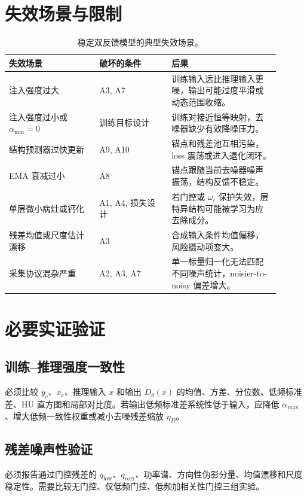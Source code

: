 \documentclass[11pt,a4paper,UTF8,fontset=fandol]{ctexart}
\theoremstyle{definition}
\begin{document}
\section{失效场景与限制}

\begin{table}[htbp]
\centering
\small
\begin{tabular}{p{0.30\linewidth}p{0.24\linewidth}p{0.36\linewidth}}
\toprule
失效场景 & 破坏的条件 & 后果 \\
\midrule
注入强度过大 & A3, A7 & 训练输入远比推理输入更噪，输出可能过度平滑或动态范围收缩。 \\
注入强度过小或 $\alpha_{\min}=0$ & 训练目标设计 & 训练对接近恒等映射，去噪器缺少有效降噪压力。 \\
结构预测器过快更新 & A9, A10 & 锚点和残差池互相污染，loss 震荡或进入退化闭环。 \\
EMA 衰减过小 & A8 & 锚点跟随当前去噪器噪声振荡，结构反馈不稳定。 \\
单层微小病灶或钙化 & A1, A4, 损失设计 & 若门控或 $\omega_i$ 保护失效，层特异结构可能被学习为应去除成分。 \\
残差均值或尺度估计漂移 & A3 & 合成输入条件均值偏移，风险摄动项变大。 \\
采集协议混杂严重 & A2, A3, A7 & 单一标量归一化无法匹配不同噪声统计，noisier-to-noisy 偏差增大。 \\
\bottomrule
\end{tabular}
\caption{稳定双反馈模型的典型失效场景。}
\label{tab:limitations}
\end{table}

\section{必要实证验证}

\subsection{训练--推理强度一致性}

必须比较 $y_c$、$x_c$、推理输入 $x$ 和输出 $D_\theta(x)$ 的均值、方差、分位数、低频标准差、HU 直方图和局部对比度。若输出低频标准差系统性低于输入，应降低 $\alpha_{\max}$、增大低频一致性权重或减小去噪残差缩放 $\eta_D$。

\subsection{残差噪声性验证}

必须报告通过门控残差的 $q_{\mathrm{low}}$、$q_{\mathrm{corr}}$、功率谱、方向性伪影分量、均值漂移和尺度稳定性。需要比较无门控、仅低频门控、低频加相关性门控三组实验。
\end{document}
